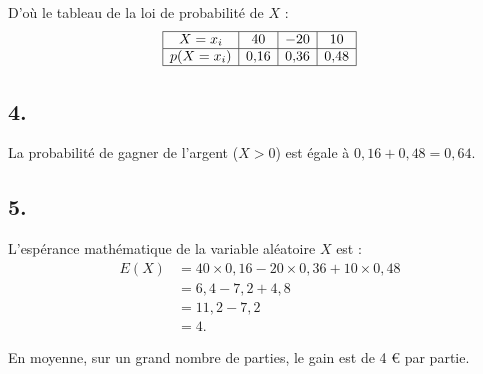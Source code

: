 \documentclass[10pt]{article}
\begin{document}
D'où le tableau de la loi de probabilité de \(X\) :
\[
\begin{array}{|c|c|c|c|}
\hline
X = x_i& 40 & -20 & 10 \\
\hline
p(X = x_i) & 0{,}16 & 0{,}36 & 0{,}48 \\
\hline
\end{array}
\]

\subsection*{4.}

La probabilité de gagner de l’argent (\(X > 0\)) est égale à \(0{,}16 + 0{,}48 = 0{,}64\).

\subsection*{5.}

L’espérance mathématique de la variable aléatoire \(X\) est :
\begin{align*}
E(X) &= 40 \times 0{,}16 - 20 \times 0{,}36 + 10 \times 0{,}48 \\
&= 6{,}4 - 7{,}2 + 4{,}8 \\
&= 11{,}2 - 7{,}2 \\
&= 4.
\end{align*}

En moyenne, sur un grand nombre de parties, le gain est de 4 € par partie.
\end{document}
